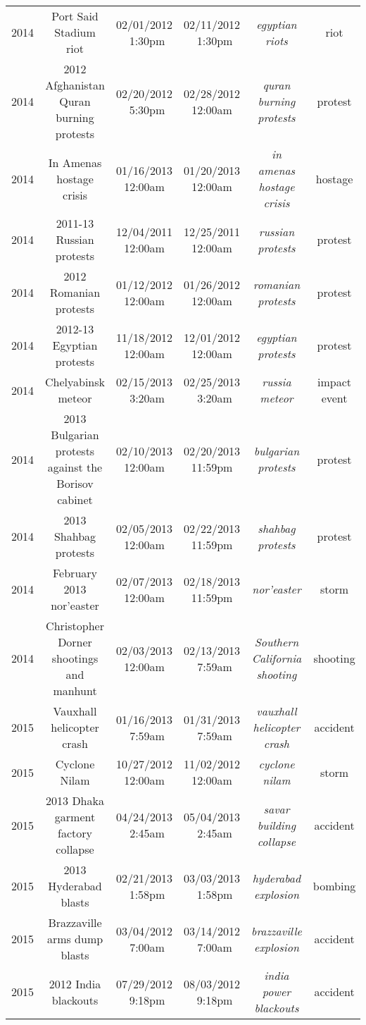 \begin{table}[p]
{\begin{tabular}{c ccc cc}
2014 & Port Said Stadium riot & 02/01/2012 ~1:30pm & 02/11/2012 ~1:30pm  & \textit{egyptian riots} & riot \\
2014 & 2012 Afghanistan Quran burning protests & 02/20/2012 ~5:30pm & 02/28/2012 12:00am & \textit{quran burning protests} & protest \\
2014 & In Amenas hostage crisis & 01/16/2013 12:00am & 01/20/2013 12:00am & \textit{in amenas hostage crisis} & hostage \\
2014 & 2011-13 Russian protests & 12/04/2011 12:00am & 12/25/2011 12:00am & \textit{russian protests} & protest \\
2014 & 2012 Romanian protests & 01/12/2012 12:00am & 01/26/2012 12:00am & \textit{romanian protests} & protest \\
2014 & 2012-13 Egyptian protests & 11/18/2012 12:00am & 12/01/2012 12:00am  & \textit{egyptian protests} & protest \\
2014 & Chelyabinsk meteor & 02/15/2013 ~3:20am & 02/25/2013 ~3:20am & \textit{russia meteor} & impact event \\
2014 & 2013 Bulgarian protests against the Borisov cabinet & 02/10/2013 12:00am & 02/20/2013 11:59pm & \textit{bulgarian protests} & protest \\
2014 & 2013 Shahbag protests & 02/05/2013 12:00am & 02/22/2013 11:59pm & \textit{shahbag protests} & protest \\
2014 & February 2013 nor'easter & 02/07/2013 12:00am & 02/18/2013 11:59pm & \textit{nor'easter} & storm \\
2014 & Christopher Dorner shootings and manhunt & 02/03/2013 12:00am & 02/13/2013 ~7:59am & \textit{Southern California shooting} & shooting \\
\midrule 
2015 & Vauxhall helicopter crash & 01/16/2013 ~7:59am & 01/31/2013 ~7:59am  & \textit{vauxhall helicopter crash} & accident \\
2015 & Cyclone Nilam & 10/27/2012 12:00am & 11/02/2012 12:00am & \textit{cyclone nilam} & storm \\
2015 & 2013 Dhaka garment factory collapse & 04/24/2013 ~2:45am & 05/04/2013 ~2:45am & \textit{savar building collapse} & accident \\
2015 &2013 Hyderabad blasts & 02/21/2013 ~1:58pm & 03/03/2013 ~1:58pm & \textit{hyderabad explosion} & bombing \\
2015 & Brazzaville arms dump blasts & 03/04/2012 ~7:00am & 03/14/2012 ~7:00am & \textit{brazzaville explosion} & accident \\
2015 & 2012 India blackouts & 07/29/2012 ~9:18pm & 08/03/2012 ~9:18pm & \textit{india power blackouts} & accident \\

\end{tabular}}
\end{table}
